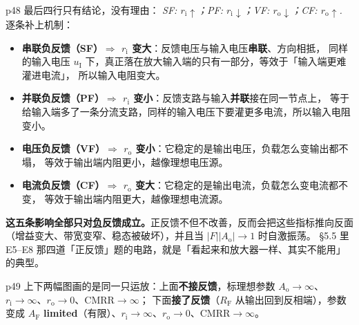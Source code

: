 \documentclass[11pt]{ctexart}
\begin{document}

p48 最后四行只有结论，没有理由：
\textit{SF: $r_{\mathrm{i}}\uparrow$；PF: $r_{\mathrm{i}}\downarrow$；VF: $r_{\mathrm{o}}\downarrow$；CF: $r_{\mathrm{o}}\uparrow$.}
逐条补上机制：

\begin{itemize}
\item \textbf{串联负反馈（SF）$\Rightarrow$ $r_{\mathrm{i}}$ 变大}：反馈电压与输入电压\textbf{串联}、方向相抵，
同样的输入电压 $u_{\mathrm{I}}$ 下，真正落在放大输入端的只有一部分，等效于「输入端更难灌进电流」，
所以输入电阻变大。
\item \textbf{并联负反馈（PF）$\Rightarrow$ $r_{\mathrm{i}}$ 变小}：反馈支路与输入\textbf{并联}接在同一节点上，
等于给输入端多了一条分流支路，同样的输入电压下要灌更多电流，所以输入电阻变小。
\item \textbf{电压负反馈（VF）$\Rightarrow$ $r_{\mathrm{o}}$ 变小}：它稳定的是输出电压，负载怎么变输出都不塌，
等效于输出端内阻更小，越像理想电压源。
\item \textbf{电流负反馈（CF）$\Rightarrow$ $r_{\mathrm{o}}$ 变大}：它稳定的是输出电流，负载怎么变电流都不变，
等效于输出端内阻更大，越像理想电流源。
\end{itemize}


\begin{wbx}
\textbf{这五条影响全部只对\underline{负}反馈成立。}正反馈不但不改善，反而会把这些指标推向反面
（增益变大、带宽变窄、稳态被破坏），并且当 $|F||A_{\mathrm{o}}|\to1$ 时自激振荡。
§5.5 里 E5--E8 那四道「正反馈」题的电路，就是「看起来和放大器一样、其实不能用」的典型。
\end{wbx}



p49 上下两幅图画的是同一只运放：上面\textbf{不接反馈}，标理想参数
$A_{\mathrm{o}}\to\infty$、$r_{\mathrm{i}}\to\infty$、$r_{\mathrm{o}}\to0$、CMRR$\to\infty$；
下面\textbf{接了反馈}（$R_{\mathrm{F}}$ 从输出回到反相端），参数变成
$A_{\mathrm{F}}$ \textbf{limited}（有限）、$r_{\mathrm{i}}\to\infty$、$r_{\mathrm{o}}\to0$、CMRR$\to\infty$。
\end{document}
